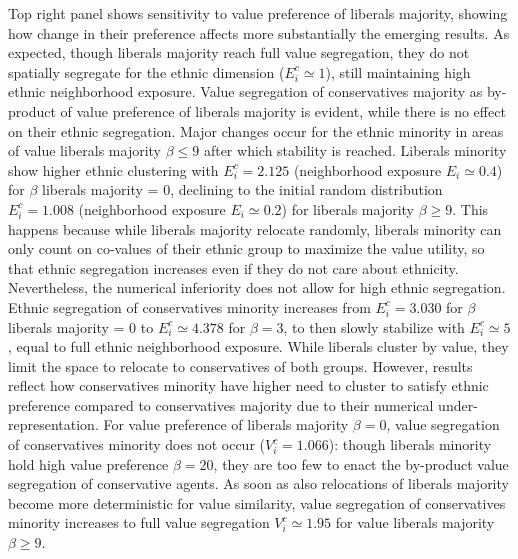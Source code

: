 \documentclass{article}
\begin{document}
Top right panel shows sensitivity to value preference of liberals majority, showing how change in their preference affects more substantially the emerging results. As expected, though liberals majority reach full value segregation, they do not spatially segregate for the ethnic dimension ($E^c_i \simeq 1$), still maintaining high ethnic neighborhood exposure. Value segregation of conservatives majority as by-product of value preference of liberals majority is evident, while there is no effect on their ethnic segregation. Major changes occur for the ethnic minority in areas of value liberals majority $\beta \leq 9$ after which stability is reached. Liberals minority show higher ethnic clustering with $E^c_i = 2.125$ (neighborhood exposure $E_i \simeq 0.4$) for $\beta$ liberals majority = 0, declining to the initial random distribution $E^c_i = 1.008$ (neighborhood exposure $E_i \simeq 0.2$) for liberals majority $\beta \geq 9$. This happens because while liberals majority relocate randomly, liberals minority can only count on co-values of their ethnic group to maximize the value utility, so that ethnic segregation increases even if they do not care about ethnicity. Nevertheless, the numerical inferiority does not allow for high ethnic segregation. 
Ethnic segregation of conservatives minority increases from $E^c_i = 3.030$ for $\beta$ liberals majority = 0 to $E^c_i \simeq 4.378$ for $\beta = 3$, to then slowly stabilize with $E^c_i \simeq 5$, equal to full ethnic neighborhood exposure. While liberals cluster by value, they limit the space to relocate to conservatives of both groups. However, results reflect how conservatives minority have higher need to cluster to satisfy ethnic preference compared to conservatives majority due to their numerical under-representation. 
For value preference of liberals majority $\beta = 0$, value segregation of conservatives minority does not occur ($V^c_i = 1.066$): though liberals minority hold high value preference $\beta = 20$, they are too few to enact the by-product value segregation of conservative agents. As soon as also relocations of liberals majority become more deterministic for value similarity, value segregation of conservatives minority increases to full value segregation $V^c_i \simeq 1.95$ for value liberals majority $\beta \geq 9$. %
\end{document}
